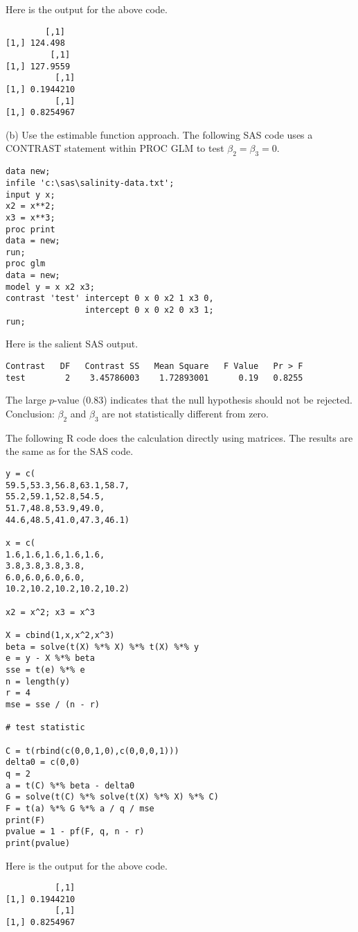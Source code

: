 \bigskip
\noindent
Here is the output for the above code.
\begin{verbatim}
        [,1]
[1,] 124.498
         [,1]
[1,] 127.9559
          [,1]
[1,] 0.1944210
          [,1]
[1,] 0.8254967
\end{verbatim}

\bigskip
\noindent
(b) Use the estimable function approach. The following SAS code
uses a CONTRAST statement within PROC GLM
to test $\beta_2=\beta_3=0$.
\begin{verbatim}
data new;
infile 'c:\sas\salinity-data.txt';
input y x;
x2 = x**2;
x3 = x**3;
proc print
data = new;
run;
proc glm
data = new;
model y = x x2 x3;
contrast 'test' intercept 0 x 0 x2 1 x3 0,
                intercept 0 x 0 x2 0 x3 1;
run;
\end{verbatim}

\bigskip
\noindent
Here is the salient SAS output.
\begin{verbatim}
Contrast   DF   Contrast SS   Mean Square   F Value   Pr > F
test        2    3.45786003    1.72893001      0.19   0.8255
\end{verbatim}
The large $p$-value (0.83) indicates that the null hypothesis should
not be rejected.
Conclusion: $\beta_2$ and $\beta_3$ are not statistically
different from zero.

\bigskip
\noindent
The following R code does the calculation directly using matrices.
The results are the same as for the SAS code.
\begin{verbatim}
y = c(
59.5,53.3,56.8,63.1,58.7,
55.2,59.1,52.8,54.5,
51.7,48.8,53.9,49.0,
44.6,48.5,41.0,47.3,46.1)

x = c(
1.6,1.6,1.6,1.6,1.6,
3.8,3.8,3.8,3.8,
6.0,6.0,6.0,6.0,
10.2,10.2,10.2,10.2,10.2)

x2 = x^2; x3 = x^3

X = cbind(1,x,x^2,x^3)
beta = solve(t(X) %*% X) %*% t(X) %*% y
e = y - X %*% beta
sse = t(e) %*% e
n = length(y)
r = 4
mse = sse / (n - r)

# test statistic

C = t(rbind(c(0,0,1,0),c(0,0,0,1)))
delta0 = c(0,0)
q = 2
a = t(C) %*% beta - delta0
G = solve(t(C) %*% solve(t(X) %*% X) %*% C)
F = t(a) %*% G %*% a / q / mse
print(F)
pvalue = 1 - pf(F, q, n - r)
print(pvalue)
\end{verbatim}

\bigskip
\noindent
Here is the output for the above code.
\begin{verbatim}
          [,1]
[1,] 0.1944210
          [,1]
[1,] 0.8254967
\end{verbatim}
